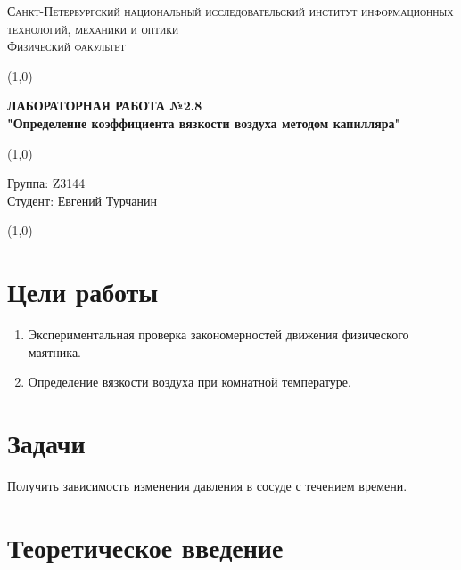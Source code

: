 \documentclass[a4paper]{article}
\date{}
\begin{document}
\begin{center}
\textsc{Санкт-Петербургский национальный исследовательский институт информационных технологий, механики и оптики\\[3mm]
Физический факультет} \\[3mm]

\end{center}
\vspace{5mm}
\line(1,0){\textwidth}
\begin{center}
\textbf{ЛАБОРАТОРНАЯ РАБОТА №2.8\\}
\textbf{"Определение коэффициента вязкости воздуха методом капилляра"}
\end{center}
\vspace{2mm}
\line(1,0){\textwidth}
\vspace{5mm}
\begin{minipage}{0.4\textwidth}
    Группа: Z3144 \\
    Студент: Евгений Турчанин\\
    \vspace{1mm}
\end{minipage}
\hfill
\vspace{1mm}
\line(1,0){\textwidth}

\section{\textbf{Цели работы}}
\begin{enumerate}
	\item Экспериментальная проверка закономерностей движения физического маятника.
    \item Определение вязкости воздуха при комнатной температуре.
\end{enumerate}

\section {\textbf{Задачи}}
Получить зависимость изменения давления в сосуде с течением времени.


\section{\textbf{Теоретическое введение}}
\end{document}
